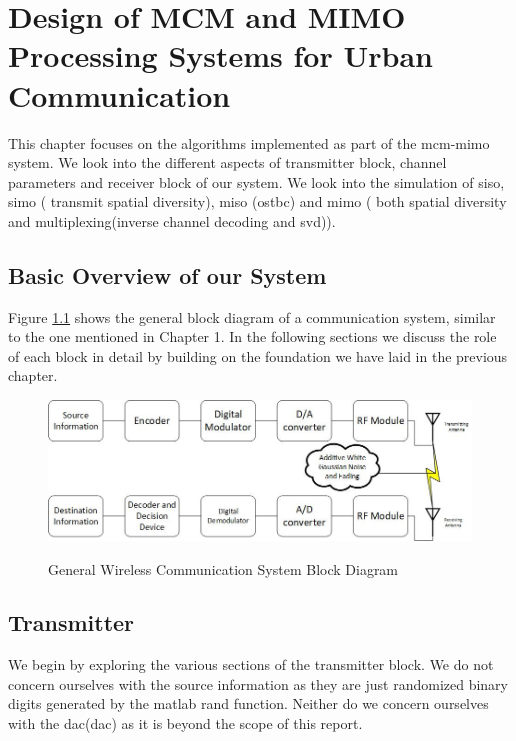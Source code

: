 \chapter{Design of MCM and MIMO Processing Systems for Urban Communication}

This chapter focuses on the algorithms implemented as part of the \acrshort{mcm}-\acrshort{mimo} system. We look into the different aspects of transmitter block, channel parameters and receiver block of our system. We look into the simulation of \acrshort{siso}, \acrshort{simo} ( transmit \gls{spatial diversity}), \acrshort{miso} (\acrshort{ostbc}) and \acrshort{mimo} ( both \gls{spatial diversity} and multiplexing(inverse channel decoding and \acrshort{svd})).
 
\section{Basic Overview of our System}

Figure \ref{fig:general block digram} shows the general block diagram of a communication system, similar to the one mentioned in Chapter 1.
In the following sections we discuss the role of each block in detail by building on the foundation we have laid in the previous chapter.

\begin{figure}[!htbp]
\centering
\includegraphics[scale=0.8]{Chapter 3/Figures/Wireless Communication System Block Diagram}
\label{fig:general block digram}
\caption{General Wireless Communication System Block Diagram}
\end{figure}

\section{Transmitter}

We begin by exploring the various sections of the transmitter block. We do not concern ourselves with the source information as they are just randomized binary digits generated by the \gls{matlab} rand function. Neither do we concern ourselves with the \acrlong{dac}(\acrshort{dac}) as it is beyond the scope of this report.\\

